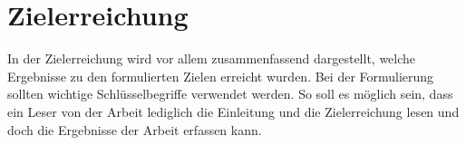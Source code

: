 \chapter*{Zielerreichung}

In der Zielerreichung wird vor allem zusammenfassend dargestellt, welche Ergebnisse zu den formulierten Zielen erreicht wurden.
Bei der Formulierung sollten wichtige Schlüsselbegriffe verwendet werden.
So soll es möglich sein, dass ein Leser von der Arbeit lediglich die Einleitung und die Zielerreichung lesen und doch die Ergebnisse der Arbeit erfassen kann.

\vfill
